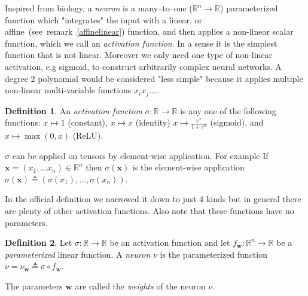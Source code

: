 \documentclass[11pt, a4paper]{report}
\theoremstyle{plain}
\theoremstyle{definition}
\newtheorem{mydef}{Definition}[chapter]
\theoremstyle{remark}
\newcommand{\R}{\mathbb{R}}
\newcommand{\x}{\mathbf{x}}
\newcommand{\w}{\mathbf{w}}
\begin{document}
Inspired from biology, a \emph{neuron} is a many--to--one ($\R^n \to \R$) parameterized
function which
"integrates" the input with a linear, or affine~(see~remark~\ref{affinelinear})
function, and 
then applies a non-linear scalar function, which we call an \emph{activation
function}.
In a sense it is the simplest
function that is not linear.
Moreover we only need one type of non-linear activation, e.g sigmoid, to
construct arbitrarily complex neural networks.
A degree 2 polynomial would be considered "less 
simple" because it applies multiple non-linear multi-variable
functions $x_i x_j\dots$.

\begin{mydef}
\label{def:activationfunction}
An \emph{activation function} $\sigma : \R \to \R$ is any one of the following functions:
$x \mapsto 1$ (constant), $x \mapsto x$ (identity)
$ x \mapsto \frac{e^x}{1 + e^x}$ (sigmoid), and $x \mapsto \max(0,x)$ (ReLU).

$\sigma$ can be applied on tensors by element-wise application.
For example
If $\x = (x_1, \dots x_n) \in \R^n$ then $\sigma(\x)$ is the element-wise application
$\sigma(\x) \triangleq (\sigma(x_1), \dots , \sigma(x_n))$.
\end{mydef}

In the official definition we narrowed it down to just 4 kinds but in general
there are plenty of other activation functions. Also note that these functions
have no parameters.

\begin{mydef}
\label{def:neuron}
Let $\sigma : \R \to \R$ be an activation function and let $f_{\w} : \R^n \to \R$
be a \emph{parameterized} linear function. A \emph{neuron} $\nu$ is the
parameterized function 
$\nu =  \nu_{\w} \triangleq \sigma \circ
f_{\w}$.

The parameters $\w$ are called the \emph{weights} of the neuron $\nu$.
\end{mydef}

\end{document}

